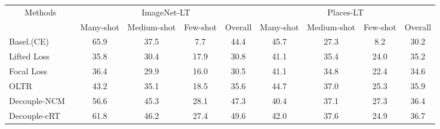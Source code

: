 \documentclass[final]{cvpr}
\begin{document}
\begin{table*}[ht]
\small 
	\centering
	\setlength{\tabcolsep}{3.5pt}
	\begin{tabular}{lcccccccc}
		\hline
		\multicolumn{1}{c|}{\multirow{2}{*}{Methods}} & \multicolumn{4}{c|}{ImageNet-LT}                                                                        & \multicolumn{4}{c}{Places-LT}                                                             \\ \cline{2-9} 
		\multicolumn{1}{c|}{}                         & Many-shot                 & Medium-shot               & Few-shot                  & \multicolumn{1}{c|}{Overall}       & Many-shot                 & Medium-shot               & Few-shot                  & Overall              \\ \hline
		\multicolumn{1}{l|}{Basel.(CE)}               & 65.9                 & 37.5                 & 7.7                  & \multicolumn{1}{c|}{44.4}          & 45.7                 & 27.3                 & 8.2                  & 30.2                 \\
		\multicolumn{1}{l|}{Lifted Loss ~\cite{oh2016deep}}              & 35.8                 & 30.4                 & 17.9                 & \multicolumn{1}{c|}{30.8}          & 41.1                 & 35.4                 & 24.0                 & 35.2                 \\
		\multicolumn{1}{l|}{Focal Loss ~\cite{focalloss} }               & 36.4                 & 29.9                 & 16.0                 & \multicolumn{1}{c|}{30.5}          & 41.1                 & 34.8                 & 22.4                 & 34.6                 \\
\multicolumn{1}{l|}{OLTR ~\cite{liu2019large}}                     & 43.2                 & 35.1                 & 18.5                 & \multicolumn{1}{c|}{35.6}          & 44.7                 & 37.0                 & 25.3                 & 35.9                 \\
		\multicolumn{1}{l|}{Decouple-NCM ~\cite{decoupling}}             & 56.6                 & 45.3                 & 28.1                 & \multicolumn{1}{c|}{47.3}          & 40.4                 & 37.1                 & 27.3                 & 36.4                 \\
		\multicolumn{1}{l|}{Decouple-cRT ~\cite{decoupling}}             & 61.8                 & 46.2                 & 27.4                 & \multicolumn{1}{c|}{49.6}          & 42.0                 & 37.6                 & 24.9                 & 36.7                 \\

\end{tabular}
\end{table*}
\end{document}
